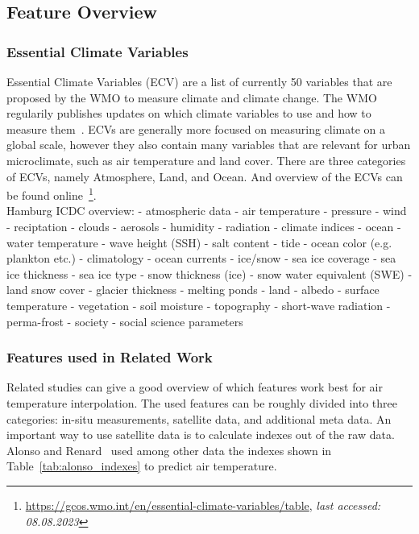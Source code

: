 \subsection{Feature Overview}

\subsubsection{Essential Climate Variables}

Essential Climate Variables (ECV) are a list of currently 50 variables that are proposed by the WMO to measure climate and climate change. The WMO regularily publishes updates on which climate variables to use and how to measure them~\cite{wmo2018guide}. ECVs are generally more focused on measuring climate on a global scale, however they also contain many variables that are relevant for urban microclimate, such as air temperature and land cover. There are three categories of ECVs, namely Atmosphere, Land, and Ocean. And overview of the ECVs can be found online~\footnote{\url{https://gcos.wmo.int/en/essential-climate-variables/table}, \textit{last accessed: 08.08.2023}}.\\

Hamburg ICDC overview:
- atmospheric data
    - air temperature
    - pressure
    - wind
    - reciptation
    - clouds
    - aerosols
    - humidity
    - radiation
    - climate indices
- ocean
    - water temperature
    - wave height (SSH)
    - salt content
    - tide
    - ocean color (e.g. plankton etc.)
    - climatology
    - ocean currents
- ice/snow
    - sea ice coverage
    - sea ice thickness
    - sea ice type
    - snow thickness (ice)
    - snow water equivalent (SWE)
    - land snow cover
    - glacier thickness
    - melting ponds
- land
    - albedo
    - surface temperature
    - vegetation
    - soil moisture
    - topography
    - short-wave radiation
    - perma-frost
- society
    - social science parameters

\subsubsection{Features used in Related Work}

Related studies can give a good overview of which features work best for air temperature interpolation. The used features can be roughly divided into three categories: in-situ measurements, satellite data, and additional meta data.
An important way to use satellite data is to calculate indexes out of the raw data. Alonso and Renard~\cite{alonso2020new} used among other data the indexes shown in Table~\ref{tab:alonso_indexes} to predict air temperature.

